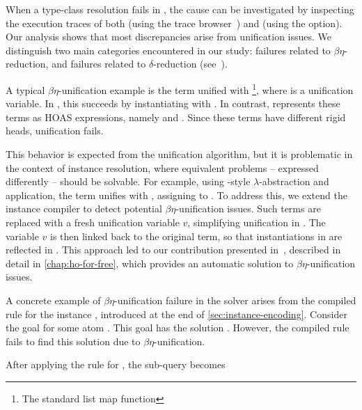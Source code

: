 When a type-class resolution fails in \elpi, the cause can be investigated by
inspecting the execution traces of both \elpi (using the \elpi trace
browser~\cite[Sec.~3.5]{hdr}) and \rocq (using the 
option). Our analysis shows that most discrepancies arise from unification
issues. We distinguish two main categories encountered in our study: failures
related to $\beta\eta$-reduction, and failures related to $\delta$-reduction
(see~\cite{rocq-unif}).

A typical $\beta\eta$-unification example is the term
 unified with \footnote{The standard list map
function}, where  is a unification variable. In \rocq, this succeeds
by instantiating  with . In contrast, \elpi
represents these terms as HOAS expressions, namely
 and
. Since these terms have different rigid heads,
unification fails.

This behavior is expected from the \elpi unification algorithm, but it is %
problematic in the context of instance resolution, where equivalent
problems -- expressed differently -- should be solvable. For example, using
\elpi-style $\lambda$-abstraction and application, the term
 unifies with , assigning  to
. To address this, we extend the instance compiler to
detect potential $\beta\eta$-unification issues. Such terms are replaced
with a fresh unification variable $v$, simplifying unification in \elpi.
The variable $v$ is then linked back to the original \rocq term, so that
instantiations in \elpi are reflected in \rocq. This approach led to our
contribution presented in~\cite{fissore2024}, described in detail in
\cref{chap:ho-for-free}, which provides an automatic solution to
$\beta\eta$-unification issues.

A concrete example of $\beta\eta$-unification failure in the \elpi solver
arises from the compiled rule for the instance , introduced at
the end of \cref{sec:instance-encoding}. Consider the goal
 for some atom . This goal has
the solution . However, the compiled rule
fails to find this solution due to $\beta\eta$-unification.

After applying the rule for , the sub-query becomes

\begin{center}\end{center}

